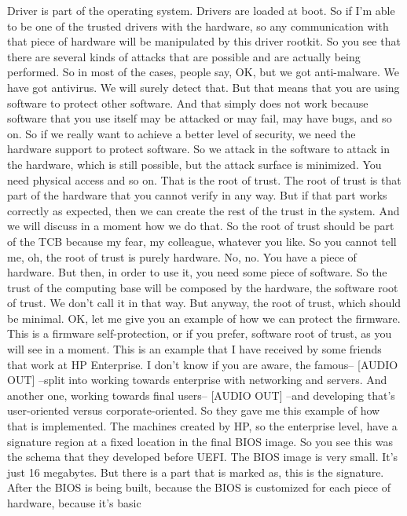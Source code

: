 Driver is part of the operating system. Drivers are loaded at boot. So if I'm
 able to be one of the trusted drivers with the hardware, so any communication
 with that piece of hardware will be manipulated by this driver rootkit. So you
 see that there are several kinds of attacks that are possible and are actually
 being performed. So in most of the cases, people say, OK, but we got
 anti-malware. We have got antivirus. We will surely detect that. But that
 means that you are using software to protect other software. And that simply
 does not work because software that you use itself may be attacked or may
 fail, may have bugs, and so on. So if we really want to achieve a better level
 of security, we need the hardware support to protect software. So we attack in
 the software to attack in the hardware, which is still possible, but the
 attack surface is minimized. You need physical access and so on. That is the
 root of trust. The root of trust is that part of the hardware that you cannot
 verify in any way. But if that part works correctly as expected, then we can
 create the rest of the trust in the system. And we will discuss in a moment
 how we do that. So the root of trust should be part of the TCB because my
 fear, my colleague, whatever you like. So you cannot tell me, oh, the root of
 trust is purely hardware. No, no. You have a piece of hardware. But then, in
 order to use it, you need some piece of software. So the trust of the
 computing base will be composed by the hardware, the software root of trust.
 We don't call it in that way. But anyway, the root of trust, which should be
 minimal. OK, let me give you an example of how we can protect the firmware.
 This is a firmware self-protection, or if you prefer, software root of trust,
 as you will see in a moment. This is an example that I have received by some
 friends that work at HP Enterprise. I don't know if you are aware, the
 famous-- [AUDIO OUT] --split into working towards enterprise with networking
 and servers. And another one, working towards final users-- [AUDIO OUT] --and
 developing that's user-oriented versus corporate-oriented. So they gave me
 this example of how that is implemented. The machines created by HP, so the
 enterprise level, have a signature region at a fixed location in the final
 BIOS image. So you see this was the schema that they developed before UEFI.
 The BIOS image is very small. It's just 16 megabytes. But there is a part that
 is marked as, this is the signature. After the BIOS is being built, because
 the BIOS is customized for each piece of hardware, because it's basic

